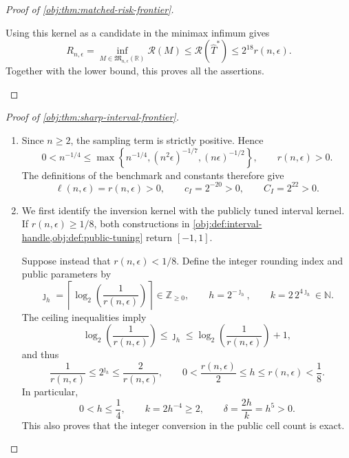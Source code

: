 \documentclass[11pt]{article}
\begin{document}
\begin{proof}[Proof of \cref{obj:thm:matched-risk-frontier}]
\begin{enumerate}
Using this kernel as a candidate in the minimax infimum gives
\[
R_{n,\epsilon}
=
\inf_{M\in\mathfrak M_{n,\epsilon}(\mathbb R)}\mathcal R(M)
\le
\mathcal R(\widehat T^*)
\le
2^{18}r(n,\epsilon).
\]
Together with the lower bound, this proves all the assertions.
\end{enumerate}
\end{proof}

\begin{proof}[Proof of \cref{obj:thm:sharp-interval-frontier}]
\begin{enumerate}
\item Since \(n\ge2\), the sampling term is strictly positive. Hence
\[
0<n^{-1/4}
\le
\max\left\{
n^{-1/4},(n^2\epsilon)^{-1/7},(n\epsilon)^{-1/2}
\right\},
\qquad
r(n,\epsilon)>0.
\]
The definitions of the benchmark and constants therefore give
\[
\ell(n,\epsilon)=r(n,\epsilon)>0,
\qquad
c_I=2^{-20}>0,
\qquad
C_I=2^{22}>0.
\]

\item We first identify the inversion kernel with the publicly tuned interval kernel. If \(r(n,\epsilon)\ge1/8\), both constructions in
\cref{obj:def:interval-handle,obj:def:public-tuning} return \([-1,1]\).

Suppose instead that \(r(n,\epsilon)<1/8\). Define the integer rounding index and public parameters by
\[
\jmath_h
=
\left\lceil\log_2\!\left(\frac1{r(n,\epsilon)}\right)\right\rceil
\in\mathbb Z_{\ge0},
\qquad
h=2^{-\jmath_h},
\qquad
k=2\,2^{4\jmath_h}\in\mathbb N.
\]
The ceiling inequalities imply
\[
\log_2\!\left(\frac1{r(n,\epsilon)}\right)
\le\jmath_h
\le
\log_2\!\left(\frac1{r(n,\epsilon)}\right)+1,
\]
and thus
\[
\frac1{r(n,\epsilon)}
\le2^{\jmath_h}
\le\frac2{r(n,\epsilon)},
\qquad
0<\frac{r(n,\epsilon)}2\le h\le r(n,\epsilon)<\frac18.
\]
In particular,
\[
0<h\le\frac14,
\qquad
k=2h^{-4}\ge2,
\qquad
\delta=\frac{2h}{k}=h^5>0.
\]
This also proves that the integer conversion in the public cell count is exact.


\end{enumerate}
\end{proof}
\end{document}
